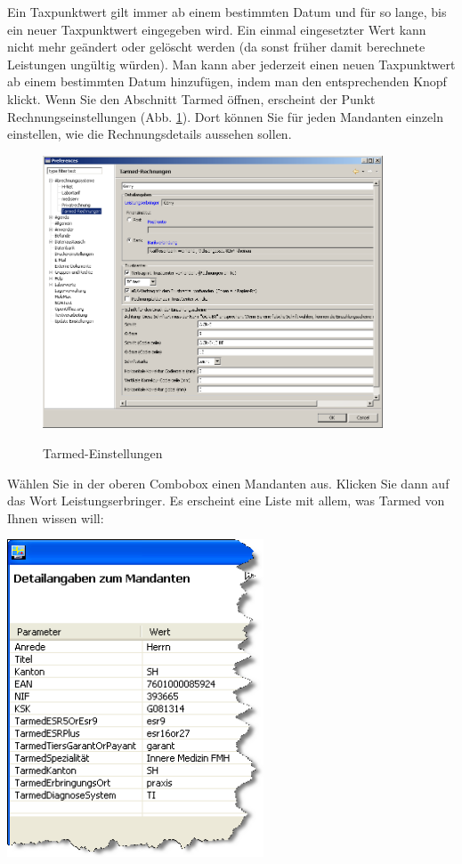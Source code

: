 Ein Taxpunktwert gilt immer ab einem bestimmten Datum und für so lange, bis ein neuer Taxpunktwert eingegeben
wird. Ein einmal eingesetzter Wert kann nicht mehr geändert oder gelöscht werden (da sonst früher damit berechnete
Leistungen ungültig würden). Man kann aber jederzeit einen neuen Taxpunktwert ab einem bestimmten Datum hinzufügen,
 indem man den entsprechenden Knopf klickt.
Wenn Sie den Abschnitt Tarmed öffnen, erscheint der Punkt  Rechnungseinstellungen (Abb. \ref{fig:tarmed2}). Dort können Sie für jeden Mandanten einzeln einstellen, wie die Rechnungsdetails aussehen sollen.

\begin{figure}
  \center
  \includegraphics[width=0.9\textwidth]{images/arztrechnung2}\\
  \caption{Tarmed-Einstellungen}\label{fig:tarmed2}
\end{figure}


Wählen Sie in der oberen Combobox einen Mandanten aus. Klicken Sie dann auf das Wort Leistungserbringer.
Es erscheint eine Liste mit allem, was Tarmed von Ihnen wissen will:

\includegraphics[width=3in]{images/tarmed3}


